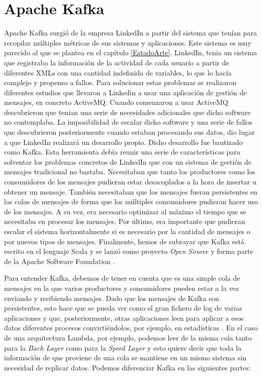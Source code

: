 \section{Apache Kafka\label{Kafka}}

Apache Kafka surgió de la empresa LinkedIn a partir del sistema que tenían
para recopilar múltiples métricas de sus sistemas y aplicaciones. Este
sistema es muy parecido al que se plantea en el capítulo \ref{EstadoArte}.
LinkedIn, tenia un sistema que registraba la información
de la actividad de cada usuario a
partir de diferentes XMLs con una cantidad indefinida de variables, lo que
lo hacía complejo y propenso a fallos. Para solucionar estas problemas se
realizaron diferentes estudios que llevaron a Linkedin a usar una
aplicación de gestión de mensajes, en concreto ActiveMQ. Cuando comenzaron
a usar ActiveMQ descubrieron que tenían una serie de necesidades
adicionales que dicho software no contemplaba. La imposibilidad de escalar
dicho software y una serie de fallos que descubrieron posteriormente cuando
estaban procesando sus datos, dio lugar a que LinkedIn realizará un
desarrollo propio. Dicho desarrollo fue bautizado como Kafka. Esta
herramienta debía reunir una serie de características para solventar los
problemas concretos de LinkedIn que con un sistema de gestión de mensajes
tradicional no bastaba. Necesitaban que tanto los productores como los
consumidores de los mensajes pudieran estar desacoplados a la hora de
insertar u obtener un mensaje. También necesitaban que los mensajes fueran
persistentes en las colas de mensajes de forma que los múltiples
consumidores pudieran hacer uso de los mensajes. A su vez, era necesario
optimizar al máximo el tiempo que se necesitaba en procesar los mensajes.
Por último, era importante que pudieran escalar el sistema horizontalmente
si es necesario por la cantidad de mensajes o por nuevos tipos de mensajes.
Finalmente, hemos de subrayar que Kafka está escrito en el lenguaje Scala y
se lanzó como proyecto \emph{Open Source} y forma parte de la Apache Software
Foundation \cite{Kfk-1}. 

Para entender Kafka, debemos de tener en cuenta
que es una simple cola de mensajes en la que varios productores y
consumidores pueden estar a la vez enviando y recibiendo mensajes. Dado que
los mensajes de Kafka son persistentes, esto hace que se pueda ver como el
gran fichero de log de varias aplicaciones y que, posteriormente, otras
aplicaciones leen para aplicar a esos datos diferentes procesos
convirtiéndolos, por ejemplo, en estadísticas \cite{Kfk-6}. En el caso de
una arquitectura Lambda, por ejemplo, podemos leer de la misma cola tanto
para la \emph{Bach Layer} como para la \emph{Speed Layer} y esto quiere
decir que toda la información de que proviene de una cola se mantiene en un
mismo sistema sin necesidad de replicar datos. Podemos diferenciar Kafka en
las siguientes partes:

